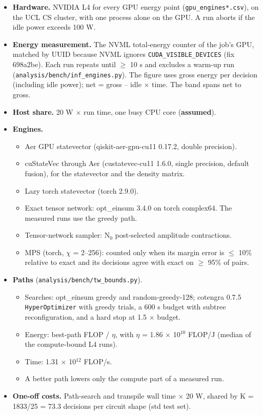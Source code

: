 \begin{itemize}
  \item \textbf{Hardware.} NVIDIA L4 for every GPU energy point (\texttt{gpu\_engines*.csv}), on the UCL CS cluster, with one process alone on the GPU. A run aborts if the idle power exceeds 100 W.
  \item \textbf{Energy measurement.} The NVML total-energy counter of the job's GPU, matched by UUID because NVML ignores \texttt{CUDA\_VISIBLE\_DEVICES} (fix 698a2be). Each run repeats until $\ge$ 10 s and excludes a warm-up run (\texttt{analysis/bench/inf\_engines.py}). The figure uses gross energy per decision (including idle power); net = gross -- idle $\times$ time. The band spans net to gross.
  \item \textbf{Host share.} 20 W $\times$ run time, one busy CPU core (\textbf{assumed}).
  \item \textbf{Engines.}
  \begin{itemize}
    \item Aer GPU statevector (qiskit-aer-gpu-cu11 0.17.2, double precision).
    \item cuStateVec through Aer (custatevec-cu11 1.6.0, single precision, default fusion), for the statevector and the density matrix.
    \item Lazy torch statevector (torch 2.9.0).
    \item Exact tensor network: opt\_einsum 3.4.0 on torch complex64. The measured runs use the greedy path.
    \item Tensor-network sampler: N$_{0}$ post-selected amplitude contractions.
    \item MPS (torch, $\chi$ = 2--256): counted only when its margin error is $\le$ 10\% relative to exact and its decisions agree with exact on $\ge$ 95\% of pairs.
  \end{itemize}
  \item \textbf{Paths} (\texttt{analysis/bench/tw\_bounds.py}).
  \begin{itemize}
    \item Searches: opt\_einsum greedy and random-greedy-128; cotengra 0.7.5 \texttt{HyperOptimizer} with greedy trials, a 600 s budget with subtree reconfiguration, and a hard stop at 1.5 $\times$ budget.
    \item Energy: best-path FLOP / $\eta$, with $\eta$ = 1.86 $\times$ 10$^{10}$ FLOP/J (median of the compute-bound L4 runs).
    \item Time: 1.31 $\times$ 10$^{12}$ FLOP/s.
    \item A better path lowers only the compute part of a measured run.
  \end{itemize}
  \item \textbf{One-off costs.} Path-search and transpile wall time $\times$ 20 W, shared by K = 1833/25 = 73.3 decisions per circuit shape (std test set).

\end{itemize}
